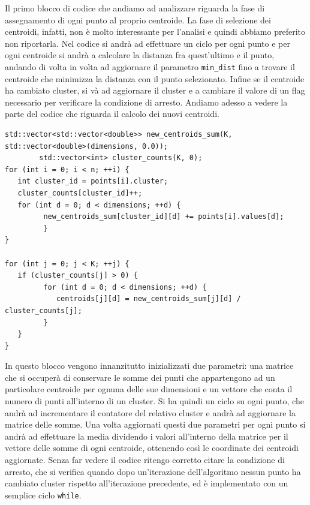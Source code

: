 \documentclass[10pt,twocolumn,letterpaper]{article}
\begin{document}
Il primo blocco di codice che andiamo ad analizzare riguarda la fase di assegnamento di ogni punto al proprio centroide. La fase di selezione dei centroidi, infatti, non è molto interessante per l'analisi e quindi abbiamo preferito non riportarla.
Nel codice si andrà ad effettuare un ciclo per ogni punto e per ogni centroide si andrà a calcolare la distanza fra quest'ultimo e il punto, andando di volta in volta ad aggiornare il parametro \lstinline{min_dist} fino a trovare il centroide che minimizza la distanza con il punto selezionato. Infine se il centroide ha cambiato cluster, si và ad aggiornare il cluster e a cambiare il valore di un flag necessario per verificare la condizione di arresto. Andiamo adesso a vedere la parte del codice che riguarda il calcolo dei nuovi centroidi.

\begin{lstlisting}[caption={Fase di aggiornamento dei centroidi della versione sequenziale}, label={lst:openmp}]
std::vector<std::vector<double>> new_centroids_sum(K, std::vector<double>(dimensions, 0.0));   
        std::vector<int> cluster_counts(K, 0);  
for (int i = 0; i < n; ++i) {   
   int cluster_id = points[i].cluster;     
   cluster_counts[cluster_id]++;       
   for (int d = 0; d < dimensions; ++d) {  
         new_centroids_sum[cluster_id][d] += points[i].values[d];  
         }
}

for (int j = 0; j < K; ++j) {   
   if (cluster_counts[j] > 0) {
         for (int d = 0; d < dimensions; ++d) {
            centroids[j][d] = new_centroids_sum[j][d] / cluster_counts[j];
         }
   }
}
\end{lstlisting}

In questo blocco vengono innanzitutto inizializzati due parametri: una matrice che si occuperà di conservare le somme dei punti che appartengono ad un particolare centroide per ognuna delle sue dimensioni e un vettore che conta il numero di punti all'interno di un cluster.
Si ha quindi un ciclo su ogni punto, che andrà ad incrementare il contatore del relativo cluster e andrà ad aggiornare la matrice delle somme.
Una volta aggiornati questi due parametri per ogni punto si andrà ad effettuare la media dividendo i valori all'interno della matrice per il vettore delle somme di ogni centroide, ottenendo così le coordinate dei centroidi aggiornate. Senza far vedere il codice ritengo corretto citare la condizione di arresto, che si verifica quando dopo un'iterazione dell'algoritmo nessun punto ha cambiato cluster rispetto all'iterazione precedente, ed è implementato con un semplice ciclo \lstinline{while}.
\end{document}
